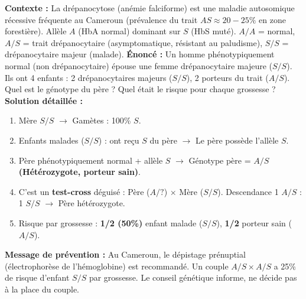 \documentclass[11pt]{article}
\begin{document}
\begin{exoresolu}
\textbf{Contexte :} La drépanocytose (anémie falciforme) est une maladie autosomique récessive fréquente au Cameroun (prévalence du trait $AS \approx 20-25\%$ en zone forestière). Allèle $A$ (HbA normal) dominant sur $S$ (HbS muté). $A/A$ = normal, $A/S$ = trait drépanocytaire (asymptomatique, résistant au paludisme), $S/S$ = drépanocytaire majeur (malade).
\textbf{Énoncé :} Un homme phénotypiquement normal (non drépanocytaire) épouse une femme drépanocytaire majeure ($S/S$). Ils ont 4 enfants : 2 drépanocytaires majeurs ($S/S$), 2 porteurs du trait ($A/S$). Quel est le génotype du père ? Quel était le risque pour chaque grossesse ?
\textbf{Solution détaillée :}
\begin{enumerate}
    \item Mère $S/S$ $\rightarrow$ Gamètes : 100\% $S$.
    \item Enfants malades ($S/S$) : ont reçu $S$ du père $\rightarrow$ Le père possède l'allèle $S$.
    \item Père phénotypiquement normal + allèle $S$ $\rightarrow$ Génotype père = \textbf{$A/S$ (Hétérozygote, porteur sain)}.
    \item C'est un \textbf{test-cross} déguisé : Père ($A/?$) $\times$ Mère ($S/S$). Descendance 1 $A/S$ : 1 $S/S$ $\rightarrow$ Père hétérozygote.
    \item Risque par grossesse : \textbf{1/2 (50\%)} enfant malade ($S/S$), \textbf{1/2} porteur sain ($A/S$).
\end{enumerate}
\tcblower
\textbf{Message de prévention :} Au Cameroun, le dépistage prénuptial (électrophorèse de l'hémoglobine) est recommandé. Un couple $A/S \times A/S$ a 25\% de risque d'enfant $S/S$ par grossesse. Le conseil génétique informe, ne décide pas à la place du couple.
\end{exoresolu}
\end{document}

